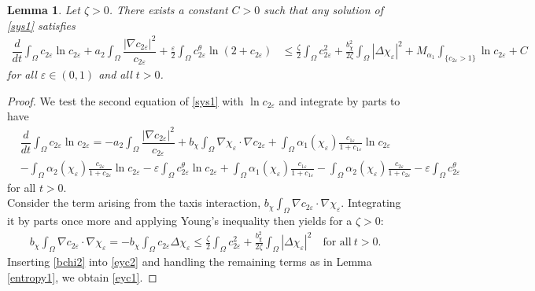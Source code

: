 \documentclass[a4paper,10pt]{article}
\newtheorem{Lemma}[Theorem]{Lemma}
\theoremstyle{definition}
\begin{document}
\begin{Lemma}
\label{elemmac2}
   Let $\zeta > 0$. There exists a constant $C > 0$ such that any solution of \eqref{sys1} satisfies
  \begin{align}
    \label{eyc1}
    \dfrac{d}{dt} \int_\Omega c_{2 \varepsilon} \ln c_{2 \varepsilon} + a_2 \int_\Omega \dfrac{|\nabla c_{2 \varepsilon}|^2}{c_{2\varepsilon}}  + \frac{\varepsilon}{2} \int_\Omega c_{2\varepsilon}^\theta \ln(2 + c_{2\varepsilon}) & \leq  \frac{\zeta}{2}\int_\Omega c_{2\varepsilon}^2 + \frac{b_\chi^2}{2\zeta} \int_\Omega |\Delta \chi_\varepsilon|^2  + M_{\alpha_1} \int_{\{c_{2\varepsilon} > 1\}}\ln c_{2\varepsilon}  +  C
  \end{align}
for all $\varepsilon \in (0, 1)$ and all $t > 0$.
\end{Lemma}

\begin{proof}
  We test the second equation of \eqref{sys1} with $\ln c_{2\varepsilon}$ and integrate by parts to have
   \begin{align}
    \label{eyc2}
    \nonumber & \dfrac{d}{dt} \int_\Omega c_{2 \varepsilon} \ln c_{2 \varepsilon} = - a_2\int_\Omega \dfrac{|\nabla c_{2 \varepsilon}|^2}{c_{2\varepsilon}} +  b_\chi \int_\Omega \nabla \chi_\varepsilon \cdot \nabla c_{2\varepsilon} + \int_\Omega \alpha_1(\chi_\varepsilon) \tfrac{c_{1\varepsilon}}{1 + c_{1\varepsilon}} \ln c_{2 \varepsilon} \\[5pt]
    & - \int_\Omega \alpha_2(\chi_\varepsilon)  \tfrac{c_{2\varepsilon}}{1 + c_{2\varepsilon}} \ln c_{2 \varepsilon}  - \varepsilon \int_\Omega c_{2\varepsilon}^\theta \ln c_{2 \varepsilon} + \int_\Omega \alpha_1(\chi_\varepsilon) \tfrac{c_{1\varepsilon}}{1 + c_{1\varepsilon}} - \int_\Omega \alpha_2(\chi_\varepsilon)  \tfrac{c_{2\varepsilon}}{1 + c_{2\varepsilon}} - \varepsilon \int_\Omega c_{2\varepsilon}^\theta
   \end{align}
  for all $t > 0$.\\[-1.5ex]
  
  \noindent
  Consider the term arising from the taxis interaction, $b_\chi \int_\Omega \nabla c_{2\varepsilon} \cdot \nabla \chi_\varepsilon$. Integrating it by parts once more and applying Young's inequality then yields for a $\zeta > 0$:
  \begin{align}
  \label{bchi2}
      b_\chi \int_\Omega \nabla c_{2\varepsilon} \cdot \nabla \chi_\varepsilon = -b_\chi \int_\Omega c_{2\varepsilon} \Delta \chi_\varepsilon \leq \frac{\zeta}{2}\int_\Omega c_{2\varepsilon}^2 + \frac{b_\chi^2}{2\zeta} \int_\Omega |\Delta \chi_\varepsilon|^2 \quad \text{for all}~ t > 0.
  \end{align}
 Inserting \eqref{bchi2} into \eqref{eyc2} and handling the remaining terms as in Lemma \ref{entropy1}, we obtain \eqref{eyc1}.
\end{proof}
\end{document}
